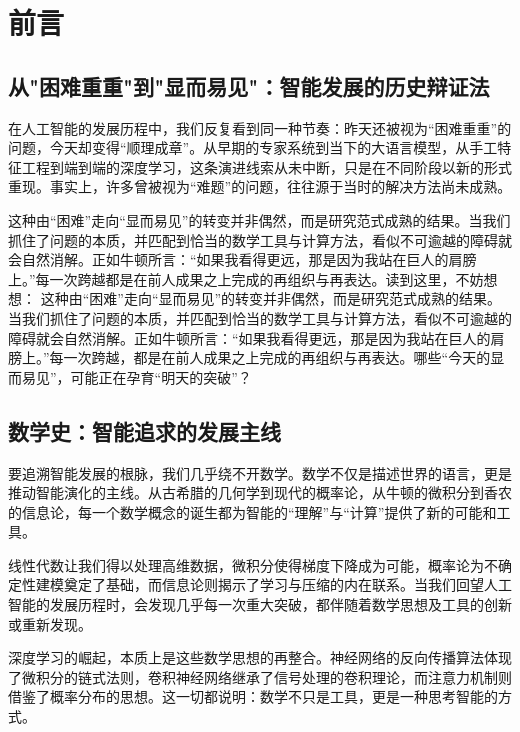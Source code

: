 
\chapter{ 前言}
\section{从"困难重重"到"显而易见"：智能发展的历史辩证法}


在人工智能的发展历程中，我们反复看到同一种节奏：昨天还被视为“困难重重”的问题，今天却变得“顺理成章”。从早期的专家系统到当下的大语言模型，从手工特征工程到端到端的深度学习，这条演进线索从未中断，只是在不同阶段以新的形式重现。事实上，许多曾被视为“难题”的问题，往往源于当时的解决方法尚未成熟。

这种由“困难”走向“显而易见”的转变并非偶然，而是研究范式成熟的结果。当我们抓住了问题的本质，并匹配到恰当的数学工具与计算方法，看似不可逾越的障碍就会自然消解。正如牛顿所言：“如果我看得更远，那是因为我站在巨人的肩膀上。”每一次跨越都是在前人成果之上完成的再组织与再表达。读到这里，不妨想想：
这种由“困难”走向“显而易见”的转变并非偶然，而是研究范式成熟的结果。当我们抓住了问题的本质，并匹配到恰当的数学工具与计算方法，看似不可逾越的障碍就会自然消解。正如牛顿所言：“如果我看得更远，那是因为我站在巨人的肩膀上。”每一次跨越，都是在前人成果之上完成的再组织与再表达。哪些“今天的显而易见”，可能正在孕育“明天的突破”？

\section{数学史：智能追求的发展主线}
要追溯智能发展的根脉，我们几乎绕不开数学。数学不仅是描述世界的语言，更是推动智能演化的主线。从古希腊的几何学到现代的概率论，从牛顿的微积分到香农的信息论，每一个数学概念的诞生都为智能的“理解”与“计算”提供了新的可能和工具。

线性代数让我们得以处理高维数据，微积分使得梯度下降成为可能，概率论为不确定性建模奠定了基础，而信息论则揭示了学习与压缩的内在联系。当我们回望人工智能的发展历程时，会发现几乎每一次重大突破，都伴随着数学思想及工具的创新或重新发现。

深度学习的崛起，本质上是这些数学思想的再整合。神经网络的反向传播算法体现了微积分的链式法则，卷积神经网络继承了信号处理的卷积理论，而注意力机制则借鉴了概率分布的思想。这一切都说明：数学不只是工具，更是一种思考智能的方式。

